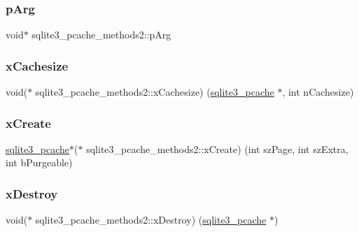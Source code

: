 \subsubsection{\texorpdfstring{pArg}{pArg}}
{\footnotesize\ttfamily void$\ast$ sqlite3\+\_\+pcache\+\_\+methods2\+::p\+Arg}

\mbox{\label{structsqlite3__pcache__methods2_a76de689adc20fdbfef427b1c7ae1bcea}} 
\subsubsection{\texorpdfstring{xCachesize}{xCachesize}}
{\footnotesize\ttfamily void($\ast$ sqlite3\+\_\+pcache\+\_\+methods2\+::x\+Cachesize) (\mbox{\hyperlink{sqlite3_8h_a096c453d937d51f7926d7d31c8e0bd2f}{sqlite3\+\_\+pcache}} $\ast$, int n\+Cachesize)}

\mbox{\label{structsqlite3__pcache__methods2_aa8babc280d7ba89c6c279301d5a36d69}} 
\subsubsection{\texorpdfstring{xCreate}{xCreate}}
{\footnotesize\ttfamily \mbox{\hyperlink{sqlite3_8h_a096c453d937d51f7926d7d31c8e0bd2f}{sqlite3\+\_\+pcache}}$\ast$($\ast$ sqlite3\+\_\+pcache\+\_\+methods2\+::x\+Create) (int sz\+Page, int sz\+Extra, int b\+Purgeable)}

\mbox{\label{structsqlite3__pcache__methods2_a17a43db31d015c29e44d68c752682365}} 
\subsubsection{\texorpdfstring{xDestroy}{xDestroy}}
{\footnotesize\ttfamily void($\ast$ sqlite3\+\_\+pcache\+\_\+methods2\+::x\+Destroy) (\mbox{\hyperlink{sqlite3_8h_a096c453d937d51f7926d7d31c8e0bd2f}{sqlite3\+\_\+pcache}} $\ast$)}

